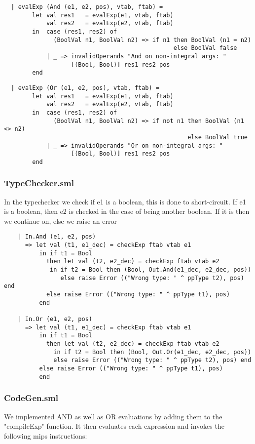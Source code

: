 \documentclass[12pt]{article}
\begin{document}
\begin{verbatim}
  | evalExp (And (e1, e2, pos), vtab, ftab) =
        let val res1   = evalExp(e1, vtab, ftab)
            val res2   = evalExp(e2, vtab, ftab)
        in  case (res1, res2) of
              (BoolVal n1, BoolVal n2) => if n1 then BoolVal (n1 = n2) 
                                                else BoolVal false
            | _ => invalidOperands "And on non-integral args: "
                   [(Bool, Bool)] res1 res2 pos
        end
\end{verbatim}
\clearpage
\begin{verbatim}
  | evalExp (Or (e1, e2, pos), vtab, ftab) =
        let val res1   = evalExp(e1, vtab, ftab)
            val res2   = evalExp(e2, vtab, ftab)
        in  case (res1, res2) of
              (BoolVal n1, BoolVal n2) => if not n1 then BoolVal (n1 <> n2) 
                                                    else BoolVal true
            | _ => invalidOperands "Or on non-integral args: " 
                   [(Bool, Bool)] res1 res2 pos
        end
\end{verbatim}

\subsubsection{TypeChecker.sml}
In the typechecker we check if e1 is a boolean, this is done to short-circuit. If e1 is a boolean, then e2 is checked in the case of being another boolean. If it is then we continue on, else we raise an error


\begin{verbatim}
    | In.And (e1, e2, pos)
      => let val (t1, e1_dec) = checkExp ftab vtab e1
          in if t1 = Bool
            then let val (t2, e2_dec) = checkExp ftab vtab e2
             in if t2 = Bool then (Bool, Out.And(e1_dec, e2_dec, pos))
                else raise Error (("Wrong type: " ^ ppType t2), pos) end
            else raise Error (("Wrong type: " ^ ppType t1), pos)
          end

    | In.Or (e1, e2, pos)
      => let val (t1, e1_dec) = checkExp ftab vtab e1
          in if t1 = Bool
            then let val (t2, e2_dec) = checkExp ftab vtab e2
              in if t2 = Bool then (Bool, Out.Or(e1_dec, e2_dec, pos))
              else raise Error (("Wrong type: " ^ ppType t2), pos) end
          else raise Error (("Wrong type: " ^ ppType t1), pos)
          end
\end{verbatim}
\subsubsection{CodeGen.sml}
We implemented AND as well as OR evaluations by adding them to the "compileExp" function. It then evaluates each expression and invokes the following mips instructions:
\end{document}
